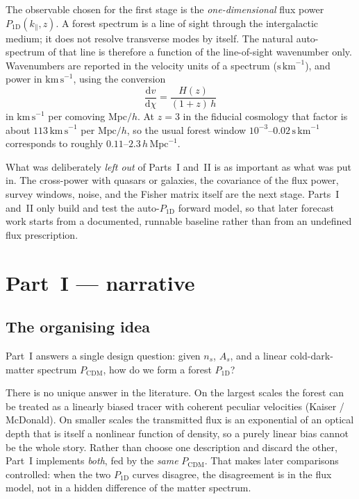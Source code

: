 \documentclass[11pt]{article}
\begin{document}
The observable chosen for the first stage is the \emph{one-dimensional} flux power $P_{1\mathrm{D}}(k_\parallel,z)$.
A forest spectrum is a line of sight through the intergalactic medium; it does not resolve transverse modes by itself.
The natural auto-spectrum of that line is therefore a function of the line-of-sight wavenumber only.
Wavenumbers are reported in the velocity units of a spectrum ($\mathrm{s\,km}^{-1}$), and power in $\mathrm{km\,s}^{-1}$, using the conversion
\begin{equation*}
\frac{\mathrm{d}v}{\mathrm{d}\chi}=\frac{H(z)}{(1+z)\,h}
\end{equation*}
in $\mathrm{km\,s}^{-1}$ per comoving $\mathrm{Mpc}/h$.
At $z=3$ in the fiducial cosmology that factor is about $113\,\mathrm{km\,s}^{-1}$ per $\mathrm{Mpc}/h$, so the usual forest window $10^{-3}$--$0.02\,\mathrm{s\,km}^{-1}$ corresponds to roughly $0.11$--$2.3\,h\,\mathrm{Mpc}^{-1}$.

What was deliberately \emph{left out} of Parts~I and~II is as important as what was put in.
The cross-power with quasars or galaxies, the covariance of the flux power, survey windows, noise, and the Fisher matrix itself are the next stage.
Parts~I and~II only build and test the auto-$P_{1\mathrm{D}}$ forward model, so that later forecast work starts from a documented, runnable baseline rather than from an undefined flux prescription.

\section{Part~I --- narrative}

\subsection{The organising idea}

Part~I answers a single design question: given $n_s$, $A_s$, and a linear cold-dark-matter spectrum $P_\mathrm{CDM}$, how do we form a forest $P_{1\mathrm{D}}$?

There is no unique answer in the literature.
On the largest scales the forest can be treated as a linearly biased tracer with coherent peculiar velocities (Kaiser / McDonald).
On smaller scales the transmitted flux is an exponential of an optical depth that is itself a nonlinear function of density, so a purely linear bias cannot be the whole story.
Rather than choose one description and discard the other, Part~I implements \emph{both}, fed by the \emph{same} $P_\mathrm{CDM}$.
That makes later comparisons controlled: when the two $P_{1\mathrm{D}}$ curves disagree, the disagreement is in the flux model, not in a hidden difference of the matter spectrum.
\end{document}
